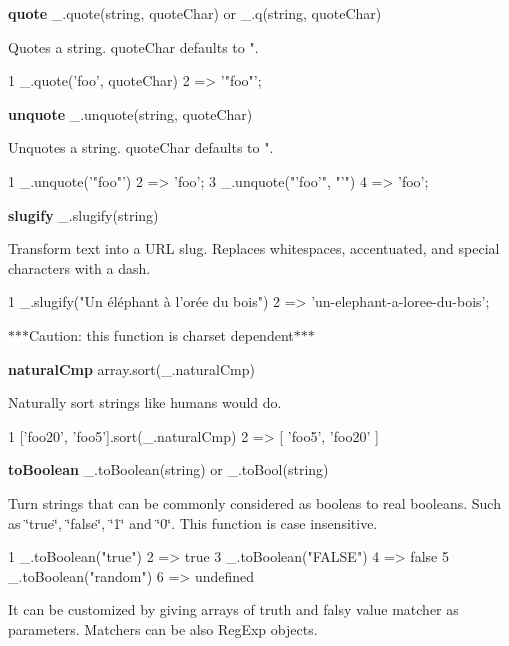 {\bfseries quote} \+\_\+.\+quote(string, quote\+Char) or \+\_\+.\+q(string, quote\+Char)

Quotes a string. {\ttfamily quote\+Char} defaults to {\ttfamily "}.


\begin{DoxyCode}
1 \_.quote('foo', quoteChar)
2 => '"foo"';
\end{DoxyCode}
 {\bfseries unquote} \+\_\+.\+unquote(string, quote\+Char)

Unquotes a string. {\ttfamily quote\+Char} defaults to {\ttfamily "}.


\begin{DoxyCode}
1 \_.unquote('"foo"')
2 => 'foo';
3 \_.unquote("'foo'", "'")
4 => 'foo';
\end{DoxyCode}


{\bfseries slugify} \+\_\+.\+slugify(string)

Transform text into a U\+R\+L slug. Replaces whitespaces, accentuated, and special characters with a dash.


\begin{DoxyCode}
1 \_.slugify("Un éléphant à l'orée du bois")
2 => 'un-elephant-a-loree-du-bois';
\end{DoxyCode}


$\ast$$\ast$$\ast$\+Caution\+: this function is charset dependent$\ast$$\ast$$\ast$

{\bfseries natural\+Cmp} array.\+sort(\+\_\+.\+natural\+Cmp)

Naturally sort strings like humans would do.


\begin{DoxyCode}
1 ['foo20', 'foo5'].sort(\_.naturalCmp)
2 => [ 'foo5', 'foo20' ]
\end{DoxyCode}


{\bfseries to\+Boolean} \+\_\+.\+to\+Boolean(string) or \+\_\+.\+to\+Bool(string)

Turn strings that can be commonly considered as booleas to real booleans. Such as \char`\"{}true\char`\"{}, \char`\"{}false\char`\"{}, \char`\"{}1\char`\"{} and \char`\"{}0\char`\"{}. This function is case insensitive.


\begin{DoxyCode}
1 \_.toBoolean("true")
2 => true
3 \_.toBoolean("FALSE")
4 => false
5 \_.toBoolean("random")
6 => undefined
\end{DoxyCode}


It can be customized by giving arrays of truth and falsy value matcher as parameters. Matchers can be also Reg\+Exp objects.


